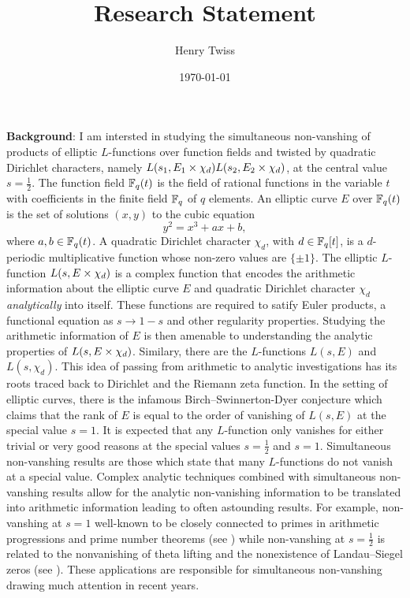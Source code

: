 \documentclass[12pt,reqno,oneside]{amsart}
\title{Research Statement}
\author{Henry Twiss}
\date{\today}
\begin{document}
\maketitle 

\textbf{Background}: I am intersted in studying the simultaneous non-vanshing of products of elliptic $L$-functions over function fields and twisted by quadratic Dirichlet characters, namely $L(s_{1},E_{1} \times \chi_{d})L(s_{2},E_{2} \times \chi_{d})$, at the central value $s = \frac{1}{2}$. The function field $\mathbb{F}_{q}(t)$ is the field of rational functions in the variable $t$ with coefficients in the finite field $\mathbb{F}_{q}$ of $q$ elements. An elliptic curve $E$ over $\mathbb{F}_{q}(t)$ is the set of solutions $(x,y)$ to the cubic equation
\[
  y^{2} = x^{3}+ax+b,
\]
where $a,b \in \mathbb{F}_{q}(t)$. A quadratic Dirichlet character $\chi_{d}$, with $d \in \mathbb{F}_{q}[t]$, is a $d$-periodic multiplicative function whose non-zero values are $\{\pm1\}$. The elliptic $L$-function $L(s,E \times \chi_{d})$ is a complex function that encodes the arithmetic information about the elliptic curve $E$ and quadratic Dirichlet character $\chi_{d}$ \textit{analytically} into itself. These functions are required to satify Euler products, a functional equation as $s \to 1-s$ and other regularity properties. Studying the arithmetic information of $E$ is then amenable to understanding the analytic properties of $L(s,E \times \chi_{d})$. Similary, there are the $L$-functions $L(s,E)$ and $L(s, \chi_{d})$. This idea of passing from arithmetic to analytic investigations has its roots traced back to Dirichlet and the Riemann zeta function. In the setting of elliptic curves, there is the infamous Birch–Swinnerton-Dyer conjecture which claims that the rank of $E$ is equal to the order of vanishing of $L(s,E)$ at the special value $s = 1$. It is expected that any $L$-function only vanishes for either trivial or very good reasons at the special values $s = \frac{1}{2}$ and $s = 1$. Simultaneous non-vanshing results are those which state that many $L$-functions do not vanish at a special value. Complex analytic techniques combined with simultaneous non-vanshing results allow for the analytic non-vanishing information to be translated into arithmetic information leading to often astounding results. For example, non-vanshing at $s = 1$ well-known to be closely connected to primes in arithmetic progressions and prime number theorems (see \cite{M}) while non-vanshing at $s = \frac{1}{2}$ is related to the nonvanishing of theta lifting and the nonexistence of Landau–Siegel zeros (see ). These applications are responsible for simultaneous non-vanshing drawing much attention in recent years.
\end{document}
